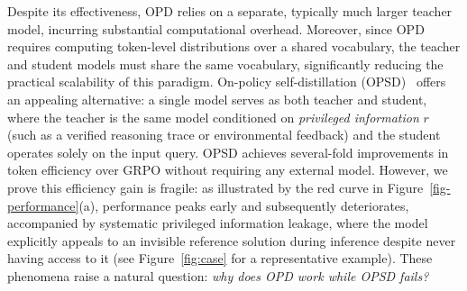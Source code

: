 \documentclass[]{jingdong}
\begin{document}
Despite its effectiveness, OPD relies on a separate, typically much larger teacher model, incurring substantial computational overhead. Moreover, since OPD requires computing token-level distributions over a shared vocabulary, the teacher and student models must share the same vocabulary, significantly reducing the practical scalability of this paradigm. On-policy self-distillation (OPSD)~\citep{zhao2026opsd,hbotter2026reinforcementlearningselfdistillation_sdpo} offers an appealing alternative: a single model serves as both teacher and student, where the teacher is the same model conditioned on \textit{privileged information} $r$ (such as a verified reasoning trace or environmental feedback) and the student operates solely on the input query. OPSD achieves several-fold improvements in token efficiency over GRPO without requiring any external model. However, we prove this efficiency gain is fragile: as illustrated by the red curve in Figure~\ref{fig-performance}(a), performance peaks early and subsequently deteriorates, accompanied by systematic privileged information leakage, where the model explicitly appeals to an invisible reference solution during inference despite never having access to it (see Figure~\ref{fig:case} for a representative example).
These phenomena raise a natural question: \textit{why does OPD work while OPSD fails?}





\end{document}
